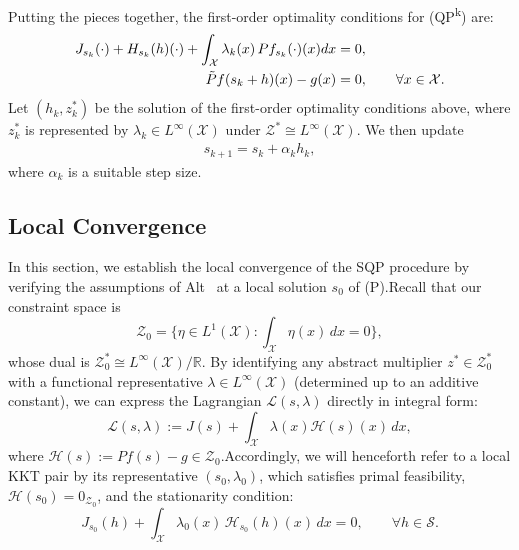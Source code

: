 \documentclass[12pt,leqno]{amsart}
\begin{document}
Putting the pieces together, the first-order optimality conditions for (QP\textsuperscript{k}) are:
\begin{align*}
     J_{s_k}(\cdot) + H_{s_k}(h)(\cdot) + \int_{\mathcal{X}} \lambda_k(x)\, Pf_{s_k}(\cdot)(x)dx &= 0,\\
     \Tilde{P}f(s_k+h)(x)-g(x) &= 0,\qquad \forall x\in\mathcal{X}.
\end{align*}
Let $(h_k, z_k^*)$ be the solution of the first-order optimality conditions above, where $z_k^*$ is represented by $\lambda_k\in L^\infty(\mathcal{X})$ under $\mathcal{Z}^*\cong L^\infty(\mathcal{X})$. We then update
\begin{align*}
    s_{k+1} = s_k + \alpha_k h_k,
\end{align*}
where $\alpha_k$ is a suitable step size.



\subsection{Local Convergence}\label{subsec:loc_conv}

In this section, we establish the local convergence of the SQP procedure by verifying the assumptions of Alt~\cite{alt1990lagrange} at a local solution $s_0$ of (P).Recall that our constraint space is
\[\mathcal{Z}_0=\Big\{ \eta \in L^1(\mathcal{X}) : \int_{\mathcal{X}}\eta(x)\,dx = 0 \Big\},
\]
whose dual is $\mathcal{Z}_0^* \cong L^\infty(\mathcal{X})/\mathbb R$. By identifying any abstract multiplier $z^*\in \mathcal{Z}_0^*$ with a functional representative $\lambda\in L^\infty(\mathcal{X})$ (determined up to an additive constant), we can express the Lagrangian $\mathcal{L}(s,\lambda)$ directly in integral form:
\[
\mathcal{L}(s,\lambda) := J(s)+\int_{\mathcal{X}}\lambda(x)\mathcal{H}(s)(x)\,dx,
\]
where $\mathcal{H}(s):=Pf(s)-g\in \mathcal{Z}_0$.Accordingly, we will henceforth refer to a local KKT pair by its representative $(s_0,\lambda_0)$, which satisfies primal feasibility, $\mathcal{H}(s_0)=0_{\mathcal{Z}_0}$, and the stationarity condition:
\[
J_{s_0}(h)+\int_{\mathcal{X}}\lambda_0(x)\,\mathcal{H}_{s_0}(h)(x)\,dx=0, \qquad \forall h\in\mathcal{S}.
\]
\end{document}
